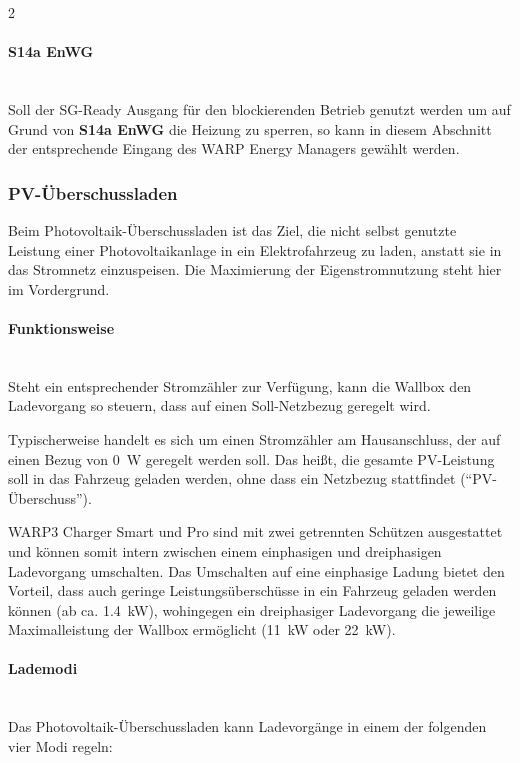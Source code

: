 \documentclass[a4paper,10pt]{article}
\begin{document}
\begin{multicols*}{2}
    \paragraph{S14a EnWG}\ \\
    Soll der SG-Ready Ausgang für den blockierenden Betrieb genutzt werden um auf Grund von \textbf{S14a EnWG} die Heizung zu sperren, so kann in diesem Abschnitt der entsprechende Eingang des WARP Energy Managers gewählt werden.

	\subsubsection{PV-Überschussladen}
    Beim Photovoltaik-Überschussladen ist das Ziel, die nicht selbst genutzte Leistung einer
	Photovoltaikanlage in ein
	Elektrofahrzeug zu laden, anstatt sie in das Stromnetz einzuspeisen. Die Maximierung der Eigenstromnutzung steht hier
	im Vordergrund.

	\paragraph{Funktionsweise}\ \\
	Steht ein entsprechender Stromzähler zur Verfügung, kann die Wallbox den
	Ladevorgang so steuern, dass auf einen Soll-Netzbezug geregelt wird.

	Typischerweise handelt es sich um einen Stromzähler am Hausanschluss, der auf
	einen Bezug von \SI{0}{\watt} geregelt werden soll. Das heißt, die gesamte
	PV-Leistung soll in das Fahrzeug geladen werden, ohne dass ein Netzbezug
	stattfindet (\enquote{PV-Überschuss}).

	WARP3 Charger Smart und Pro sind mit zwei getrennten Schützen
	ausgestattet und können somit intern zwischen einem einphasigen und dreiphasigen
	Ladevorgang umschalten. Das Umschalten auf eine einphasige Ladung bietet den Vorteil, dass auch geringe
	Leistungsüberschüsse in ein Fahrzeug geladen werden können (ab ca.
	\SI{1,4}{\kilo\watt}), wohingegen ein dreiphasiger Ladevorgang die jeweilige
	Maximalleistung der Wallbox ermöglicht (\SI{11}{\kilo\watt} oder
	\SI{22}{\kilo\watt}).

	\paragraph{Lademodi}\ \\

	Das Photovoltaik-Überschussladen kann Ladevorgänge in einem der folgenden vier Modi regeln:


\end{multicols*}
\end{document}
